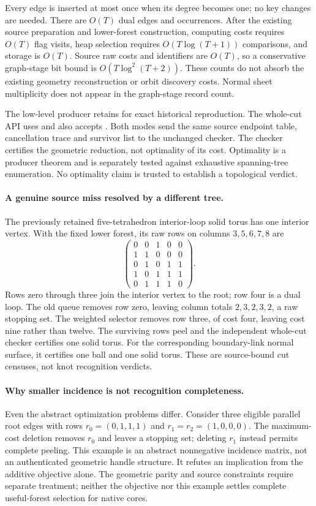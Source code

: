 Every edge is inserted at most once when its degree becomes one; no key
changes are needed. There are $O(T)$ dual edges and occurrences. After the
existing source preparation and lower-forest construction, computing costs
requires $O(T)$ flag visits, heap selection requires $O(T\log(T+1))$
comparisons, and storage is $O(T)$. Source raw costs and identifiers are
$O(T)$, so a conservative graph-stage bit bound is
$O(T\log^2(T+2))$. These counts do not absorb the existing geometry
reconstruction or orbit discovery costs. Normal sheet multiplicity does
not appear in the graph-stage record count.

The low-level producer retains  for exact historical
reproduction. The whole-cut API uses  and
also accepts . Both modes send the same source
endpoint table, cancellation trace and survivor list to the unchanged
checker. The checker certifies the geometric reduction, not optimality of
its cost. Optimality is a producer theorem and is separately tested against
exhaustive spanning-tree enumeration. No optimality claim is trusted to
establish a topological verdict.

\paragraph{A genuine source miss resolved by a different tree.}
The previously retained five-tetrahedron interior-loop solid torus has
one interior vertex. With the fixed lower forest, its raw rows on columns
$3,5,6,7,8$ are
\[
\begin{pmatrix}
0&0&1&0&0\\
1&1&0&0&0\\
0&1&0&1&1\\
1&0&1&1&1\\
0&1&1&1&0
\end{pmatrix}.
\]
Rows zero through three join the interior vertex to the root; row four
is a dual loop. The old queue removes row zero, leaving column totals
$2,3,2,3,2$, a raw stopping set. The weighted selector removes row three,
of cost four, leaving cost nine rather than twelve. The surviving rows
peel and the independent whole-cut checker certifies one solid torus.
For the corresponding boundary-link normal surface, it certifies one
ball and one solid torus. These are source-bound cut censuses, not knot
recognition verdicts.

\paragraph{Why smaller incidence is not recognition completeness.}
Even the abstract optimization problems differ. Consider three eligible
parallel root edges with rows
$r_0=(0,1,1,1)$ and $r_1=r_2=(1,0,0,0)$. The maximum-cost deletion removes
$r_0$ and leaves a stopping set; deleting $r_1$ instead permits complete
peeling. This example is an abstract nonnegative incidence matrix, not an
authenticated geometric handle structure. It refutes an implication from
the additive objective alone. The geometric parity and source constraints
require separate treatment; neither the objective nor this example settles
complete useful-forest selection for native cores.


